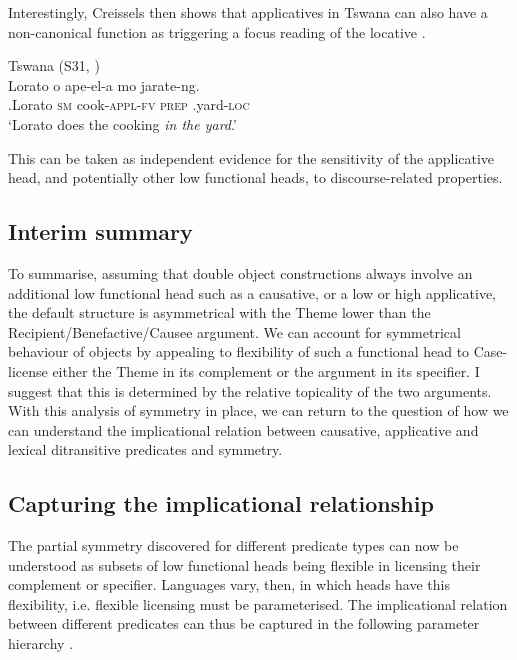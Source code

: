 \documentclass[output=paper]{LSP/langsci}
\begin{document}
Interestingly, Creissels then shows that applicatives in Tswana can also have a non-canonical function as triggering a focus reading of the locative .


 \ea \label{ex:vanderwal:34}%
Tswana (S31, \citealt[15]{Creissels2004})\\
 \gll      Lorato  o  ape-el-a  mo  jarate-ng.\\
  .Lorato  \textsc{sm}  cook-\textsc{appl}{}-\textsc{fv}  \textsc{prep}  .yard-\textsc{loc}\\
    \glt ‘Lorato does the cooking \textit{in the yard}.’
\z

This can be taken as independent evidence for the sensitivity of the applicative head, and potentially other low functional heads, to discourse-related properties.

\subsection{Interim summary}\label{sec:vdw:3.5}
\largerpage

To summarise, assuming that double object constructions always involve an additional low functional head such as a causative, or a low or high applicative, the default structure is asymmetrical with the Theme lower than the Recipient/Benefactive/Causee argument. We can account for symmetrical behaviour of objects by appealing to flexibility of such a functional head to Case-license either the Theme in its complement or the argument in its specifier. I suggest that this is determined by the relative topicality of the two arguments. With this analysis of symmetry in place, we can return to the question of how we can understand the implicational relation between causative, applicative and lexical ditransitive predicates and symmetry.

\subsection{Capturing the implicational relationship}\label{sec:vdw:3.6}

The partial symmetry discovered for different predicate types can now be understood as subsets of low functional heads being flexible in licensing their complement or specifier. Languages vary, then, in which heads have this flexibility, i.e. flexible licensing must be parameterised. The implicational relation between different predicates can thus be captured in the following parameter hierarchy .
\end{document}
